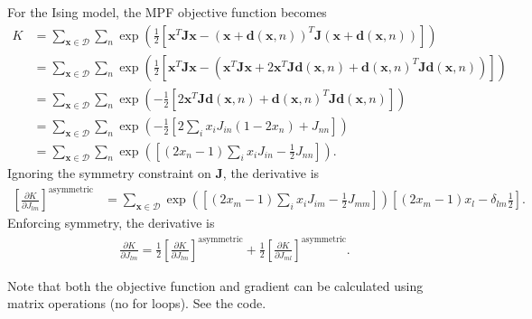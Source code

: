 \documentclass{article}
\newcommand{\pd}[2]{\frac{\partial #1}{\partial #2}}
\newcommand{\mb}{\mathbf}
\begin{document}
For the Ising model, the MPF objective function becomes
\begin{align}
K & = \sum_{\mb x \in \mathcal D} \sum_n \exp\left( \frac{1}{2}\left[
\mb x^T \mb J \mb x
- (\mb x + {\mb d}(\mb x, n))^T \mb J (\mb x + {\mb d}(\mb x, n))
\right] \right) \\
& = \sum_{\mb x \in \mathcal D} \sum_n \exp\left( \frac{1}{2}\left[
\mb x^T \mb J \mb x
- \left(
\mb x^T \mb J \mb x
+
2 \mb x^T \mb J {\mb d}(\mb x, n)
+
{\mb d}(\mb x, n)^T \mb J {\mb d}(\mb x, n)
\right) 
\right] \right)
 \\
& = \sum_{\mb x \in \mathcal D} \sum_n \exp\left( -\frac{1}{2}\left[
2 \mb x^T \mb J {\mb d}(\mb x, n)
+
{\mb d}(\mb x, n)^T \mb J {\mb d}(\mb x, n)
\right]
\right)  \\
& = \sum_{\mb x \in \mathcal D} \sum_n \exp\left( -\frac{1}{2}\left[
2 \sum_i x_i J_{in} \left( 1 - 2 x_n  \right)
+
J_{nn}
\right]
\right)\\
& = \sum_{\mb x \in \mathcal D} \sum_n \exp\left( \left[
\left( 2 x_n - 1 \right) \sum_i x_i J_{in}
-
\frac{1}{2}J_{nn}
\right]
\right)
.
\end{align}
Ignoring the symmetry constraint on $\mb J$, the derivative is
\begin{align}
\left[ \pd{K}{J_{lm}} \right]^{\mathrm{asymmetric}} & = \sum_{\mb x \in \mathcal D} \exp\left( \left[
\left( 2 x_m - 1 \right) \sum_i x_i J_{im}
-
\frac{1}{2}J_{mm}
\right]
\right)
	\left[
		\left( 2 x_m - 1 \right) x_l
		-
		\delta_{lm} \frac{1}{2}
	\right]
.
\end{align}
Enforcing symmetry, the derivative is
\begin{align}
\pd{K}{J_{lm}}  = \frac{1}{2}\left[ \pd{K}{J_{lm}} \right]^{\mathrm{asymmetric}} +\frac{1}{2}\left[ \pd{K}{J_{ml}} \right]^{\mathrm{asymmetric}}
.
\end{align}

Note that both the objective function and gradient can be calculated using matrix operations (no for loops).  See the code.
		
\end{document}
